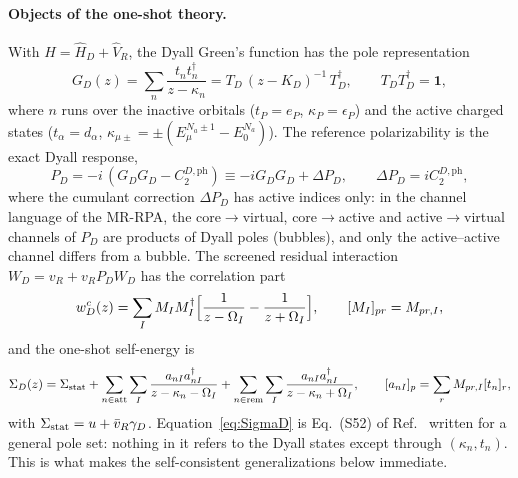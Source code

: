 \documentclass[11pt,a4paper]{article}
\begin{document}
\paragraph{Objects of the one-shot theory.}
With $\hat H=\hat H_D+\hat V_R$, the Dyall Green's function has the pole
representation
\begin{equation}
  G_D(z)=\sum_n\frac{t_nt_n^\dagger}{z-\kappa_n}=T_D\,(z-K_D)^{-1}\,T_D^\dagger,
  \qquad T_DT_D^\dagger=\mathbf 1,
  \label{eq:GD}
\end{equation}
where $n$ runs over the inactive orbitals ($t_P=e_P$, $\kappa_P=\epsilon_P$)
and the active charged states ($t_\alpha=d_\alpha$, $\kappa_{\mu\pm}=\pm(E^{N_a\pm1}_\mu-E^{N_a}_0)$).
The reference polarizability is the exact Dyall response,
\begin{equation}
  P_D=-i\,(G_DG_D-C_2^{D,\mathrm{ph}})\equiv-iG_DG_D+\Delta P_D,
  \qquad \Delta P_D=iC_2^{D,\mathrm{ph}},
  \label{eq:PD}
\end{equation}
where the cumulant correction $\Delta P_D$ has active indices only: in the
channel language of the MR-RPA, the core$\to$virtual, core$\to$active and
active$\to$virtual channels of $P_D$ are products of Dyall poles (bubbles),
and only the active--active channel differs from a bubble.  The screened
residual interaction $W_D=v_R+v_RP_DW_D$ has the correlation part
\begin{equation}
  w^c_D(z)=\sum_I M_IM_I^\dagger\Bigl[\frac{1}{z-\Omega_I}-\frac{1}{z+\Omega_I}\Bigr],
  \qquad [M_I]_{pr}=M_{pr,I},
  \label{eq:WD}
\end{equation}
and the one-shot self-energy is
\begin{equation}
  \Sigma_D(z)=\Sigma_{\rm stat}+\sum_{n\in\mathrm{att}}\sum_I\frac{a_{nI}a_{nI}^\dagger}{z-\kappa_n-\Omega_I}
  +\sum_{n\in\mathrm{rem}}\sum_I\frac{a_{nI}a_{nI}^\dagger}{z-\kappa_n+\Omega_I},
  \qquad [a_{nI}]_p=\sum_rM_{pr,I}[t_n]_r,
  \label{eq:SigmaD}
\end{equation}
with $\Sigma_{\rm stat}=u+\bar v_R\gamma_D$.  Equation~\eqref{eq:SigmaD} is
Eq.~(S52) of Ref.~\cite{WFL2026} written for a general pole set: nothing in
it refers to the Dyall states except through $(\kappa_n,t_n)$.  This is what
makes the self-consistent generalizations below immediate.
\end{document}

